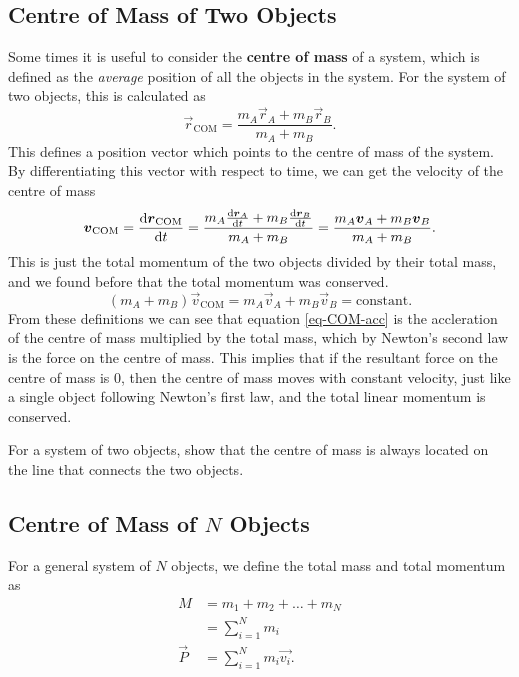 \documentclass[../classical_mechanics.tex]{subfiles}
\begin{document}
        \subsection{Centre of Mass of Two Objects}\label{sec:centre-of-mass:subsec:two-objects}
            Some times it is useful to consider the \textbf{centre of mass} of a system, which is defined as the \textit{average} position of all the objects in the system.
            For the system of two objects, this is calculated as
            \begin{equation}
                \vec{r}_\text{COM}=\frac{m_A\vec{r}_A+m_B\vec{r}_B}{m_A+m_B}.
            \end{equation}
            This defines a position vector which points to the centre of mass of the system.
            By differentiating this vector with respect to time, we can get the velocity of the centre of mass
            \begin{equation}
                \vec{v}_\text{COM}=\dv{\vec{r}_\text{COM}}{t}=\frac{m_A\dv{\vec{r}_A}{t}+m_B\dv{\vec{r}_B}{t}}{m_A+m_B}=\frac{m_A\vec{v}_A+m_B\vec{v}_B}{m_A+m_B}.
            \end{equation}
            This is just the total momentum of the two objects divided by their total mass, and we found before that the total momentum was conserved.
            \begin{equation}
                (m_A+m_B)\vec{v}_\text{COM}=m_A\vec{v}_A+m_B\vec{v}_B=\text{constant}.
            \end{equation}
            From these definitions we can see that equation \ref{eq-COM-acc} is the accleration of the centre of mass multiplied by the total mass, which by Newton's second law is the force on the centre of mass.
            This implies that if the resultant force on the centre of mass is 0, then the centre of mass moves with constant velocity, just like a single object following Newton's first law, and the total linear momentum is conserved.
            \begin{example}
                For a system of two objects, show that the centre of mass is always located on the line that connects the two objects.
            \end{example}

        \subsection{Centre of Mass of $N$ Objects}\label{sec:centre-of-mass:subsec:n-objects}
        For a general system of $N$ objects, we define the total mass and total momentum as
        \begin{align}
            M&=m_1+m_2+\dots+m_N\\
            &=\sum_{i=1}^{N}m_i\\
            \vec{P}&=\sum_{i=1}^{N}m_i\vec{v_i}.
        \end{align}
\end{document}

